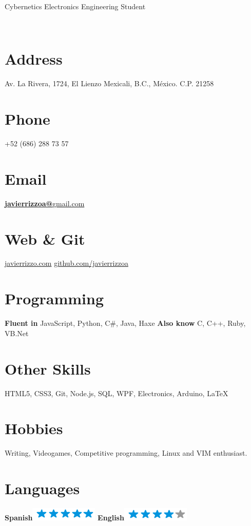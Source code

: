 \documentclass[]{friggeri-cv}
\newcommand{\Csh}{C{\lserif\#}}
\begin{document}
      {Cybernetics Electronics Engineering Student}
      

\begin{aside}
    ~
    ~
    ~
  \section{Address}
    Av. La Rivera, 1724, 
    El Lienzo
    Mexicali, B.C., México.
    C.P. 21258
    ~
  \section{Phone}
    +52 (686) 288 73 57
    ~
  \section{Email}
    \href{mailto:javierrizzoa@gmail.com}{\textbf{javierrizzoa@}gmail.com}
    ~
  \section{Web \& Git}
    \href{http://javierrizzo.com}{javierrizzo.com}
    \href{https://github.com/javierrizzoa}{github.com/javierrizzoa}
    ~
  \section{Programming}
  \textbf{Fluent in }
  JavaScript, Python, \Csh{}, Java, Haxe
  \textbf{Also know }
  C, C++, Ruby, VB.Net
    ~
  \section{Other Skills}
  HTML5, CSS3, Git, Node.js, SQL, WPF, Electronics, Arduino, \LaTeX
  ~
  \section{Hobbies}
  Writing, Videogames, Competitive programming, Linux and VIM enthusiast.
  ~
  \section{Languages}
    \textbf{Spanish}\includegraphics[scale=0.40]{img/5stars.png}
    \textbf{English}\includegraphics[scale=0.40]{img/4stars.png}
\end{aside}
\end{document}
